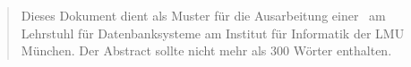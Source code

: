 \documentclass[pdftex,12pt,a4paper]{report}
\begin{document}
\deckblatt

\erklaerung

\begin{abstract}
Dieses Dokument dient als Muster für die Ausarbeitung einer \the\arbeit\
am Lehrstuhl für Datenbanksysteme am Institut für
Informatik der LMU München. Der Abstract sollte nicht mehr als 300 Wörter enthalten.
\end{abstract}

\tableofcontents















 
\end{document}
